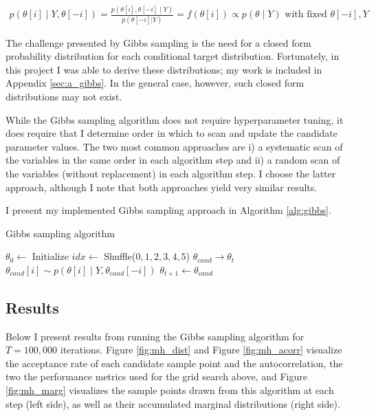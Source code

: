 \documentclass{article}
\begin{document}
\begin{align}
  p(\theta[i] \mid Y, \theta[-i]) = \frac{p(\theta[i], \theta[-i] \mid Y)}{p(\theta[-i] | Y)} = f(\theta[i]) \propto p(\theta \mid Y) \textrm{ with fixed } \theta[-i], Y
\end{align}

The challenge presented by Gibbs sampling is the need for a closed form probability distribution for each conditional target distribution. Fortunately, in this project I was able to derive these distributions; my work is included in Appendix \ref{sec:a_gibbs}. In the general case, however, such closed form distributions may not exist.

While the Gibbs sampling algorithm does not require hyperparameter tuning, it does require that I determine order in which to scan and update the candidate parameter values. The two most common approaches are i) a systematic scan of the variables in the same order in each algorithm step and ii) a random scan of the variables (without replacement) in each algorithm step. I choose the latter approach, although I note that both approaches yield very similar results. 

I present my implemented Gibbs sampling approach in Algorithm \ref{alg:gibbs}. 
\begin{algorithm}[H]
  \caption{\label{alg:gibbs}Gibbs sampling algorithm}
    \begin{algorithmic}[1]
      \State $\theta_0 \longleftarrow$  Initialize
        \State $idx \longleftarrow$ Shuffle($0,1,2,3,4,5$) 
        \State $\theta_{cand} \longrightarrow \theta_t$
          \State $\theta_{cand}[i] \sim p(\theta[i] \mid Y, \theta_{cand}[-i])$
        \EndFor
        \State $\theta_{t+1} \longleftarrow \theta_{cand}$
      \EndFor
    \end{algorithmic}
  \end{algorithm}


\subsection{Results}
Below I present results from running the Gibbs sampling algorithm for $T=100,000$ iterations. Figure \ref{fig:mh_dist} and Figure \ref{fig:mh_acorr} visualize the acceptance rate of each candidate sample point and the autocorrelation, the two the performance metrics used for the grid search above, and Figure \ref{fig:mh_marg} visualizes the sample points drawn from this algorithm at each step (left side), as well as their accumulated marginal distributions (right side).
\end{document}

